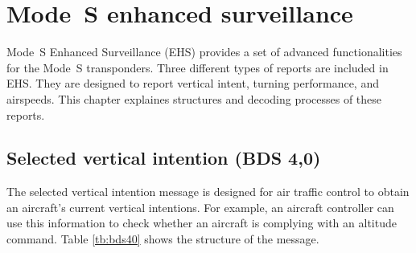 \chapter{Mode~S enhanced surveillance}

Mode~S Enhanced Surveillance (EHS) provides a set of advanced functionalities for the Mode~S transponders. Three different types of reports are included in EHS. They are designed to report vertical intent, turning performance, and airspeeds. This chapter explaines structures and decoding processes of these reports.

\section{Selected vertical intention (BDS 4,0)}

The selected vertical intention message is designed for air traffic control to obtain an aircraft's current vertical intentions. For example, an aircraft controller can use this information to check whether an aircraft is complying with an altitude command. Table \ref{tb:bds40} shows the structure of the message.

